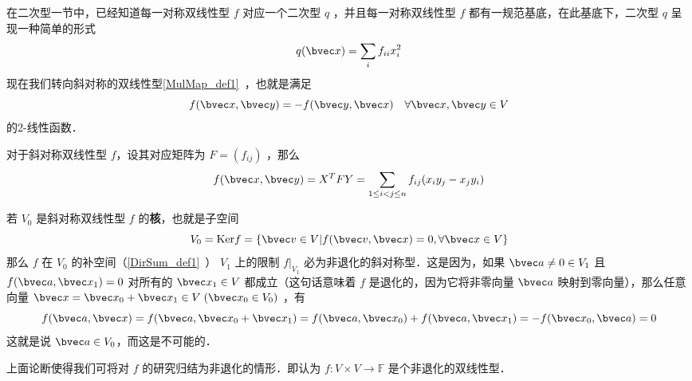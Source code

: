 
\begin{issues}
\issueTODO
\end{issues}

在二次型一节中，已经知道每一对称双线性型 $f$ 对应一个二次型 $q$ ，并且每一对称双线性型 $f$ 都有一规范基底，在此基底下，二次型 $q$ 呈现一种简单的形式
\begin{equation}
q(\bvec x)=\sum_{i}f_{ii}x_i^2
\end{equation}
现在我们转向斜对称的双线性型\autoref{MulMap_def1}~，也就是满足 
\begin{equation}
f(\bvec x,\bvec y)=-f(\bvec y,\bvec x)\quad \forall \bvec x,\bvec y\in V
\end{equation}
的2-线性函数．

对于斜对称双线性型 $f$，设其对应矩阵为 $F=(f_{ij})$ ，那么
\begin{equation}
f(\bvec x,\bvec y)=X^{T}FY=\sum_{1\leq i<j\leq n}f_{ij}(x_iy_j-x_jy_i)
\end{equation}

若 $V_0$ 是斜对称双线性型 $f$ 的\textbf{核}，也就是子空间
\begin{equation}
V_0=\mathrm{Ker} f=\{\bvec v\in V|f(\bvec v,\bvec x)=0,\forall\bvec x\in V\}
\end{equation}
那么 $f$ 在 $V_0$ 的补空间（\autoref{DirSum_def1}~） $V_1$ 上的限制 $f|_{V_1}$ 必为非退化的斜对称型．这是因为，如果 $\bvec a\neq0\in V_1$ 且 $f(\bvec a,\bvec x_1)=0$ 对所有的 $\bvec x_1\in V$ 都成立（这句话意味着 $f$ 是退化的，因为它将非零向量 $\bvec a$ 映射到零向量），那么任意向量 $\bvec x=\bvec x_0+\bvec x_1\in V \;(\bvec x_0\in V_0)$ ，有
\begin{equation}
f(\bvec a,\bvec x)=f(\bvec a,\bvec x_0+\bvec x_1)=f(\bvec a,\bvec x_0)+f(\bvec a,\bvec x_1)=-f(\bvec x_0,\bvec a)=0
\end{equation}
 这就是说 $\bvec a\in V_0$，而这是不可能的．

 上面论断使得我们可将对 $f$ 的研究归结为非退化的情形．即认为 $f:V\times V\rightarrow\mathbb{F}$ 是个非退化的双线性型．
